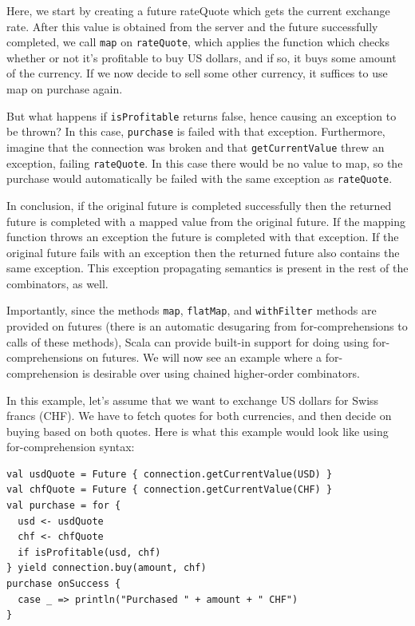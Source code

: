 Here, we start by creating a future rateQuote which gets the current exchange
rate. After this value is obtained from the server and the future successfully
completed, we call \verb|map| on \verb|rateQuote|, which applies the function
which checks whether or not it's profitable to buy US dollars, and if so, it
buys some amount of the currency. If we now decide to sell some other currency,
it suffices to use map on purchase again.

But what happens if \verb|isProfitable| returns false, hence causing an
exception to be thrown? In this case, \verb|purchase| is failed with that
exception. Furthermore, imagine that the connection was broken and that
\verb|getCurrentValue| threw an exception, failing \verb|rateQuote|. In this
case there would be no value to map, so the purchase would automatically be
failed with the same exception as \verb|rateQuote|.

In conclusion, if the original future is completed successfully then the
returned future is completed with a mapped value from the original future. If
the mapping function throws an exception the future is completed with that
exception. If the original future fails with an exception then the returned
future also contains the same exception. This exception propagating semantics is
present in the rest of the combinators, as well.

Importantly, since the methods \verb|map|, \verb|flatMap|, and \verb|withFilter|
methods are provided on futures (there is an automatic desugaring from
for-comprehensions to calls of these methods), Scala can provide built-in
support for doing using for-comprehensions on futures. We will now see an
example where a for-comprehension is desirable over using chained higher-order
combinators.

In this example, let's assume that we want to exchange US dollars for Swiss
francs (CHF). We have to fetch quotes for both currencies, and then decide on
buying based on both quotes. Here is what this example would look like using for-comprehension syntax:

\begin{verbatim}
val usdQuote = Future { connection.getCurrentValue(USD) }
val chfQuote = Future { connection.getCurrentValue(CHF) }
val purchase = for {
  usd <- usdQuote
  chf <- chfQuote
  if isProfitable(usd, chf)
} yield connection.buy(amount, chf)
purchase onSuccess {
  case _ => println("Purchased " + amount + " CHF")
}
\end{verbatim}

